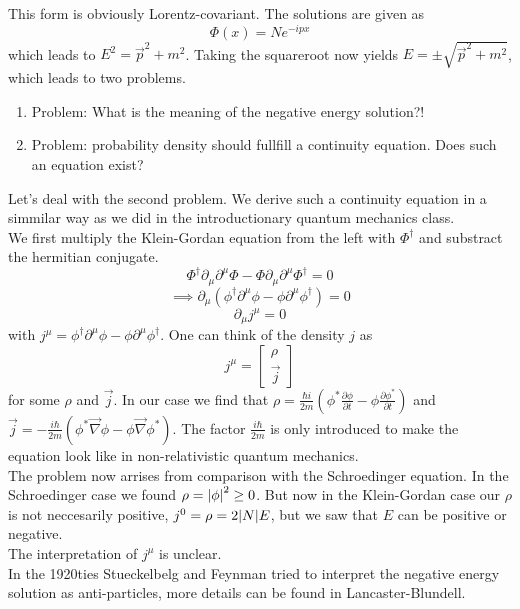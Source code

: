 \documentclass{report}
\begin{document}
This form is obviously Lorentz-covariant.
The solutions are given as \[
	\Phi(x) = N e^{-ipx}
\] which leads to $E^2 = \vec{p}^2 + m^2$. Taking the squareroot now yields $E = \pm \sqrt{\vec{p}^2 + m^2} $, which leads to two problems.
\begin{enumerate}
	\item Problem: What is the meaning of the negative energy solution?!\\
	\item Problem: probability density should fullfill a continuity equation. Does such an equation exist?
\end{enumerate}
Let's deal with the second problem. We derive such a continuity equation in a simmilar way as we did in the introductionary quantum mechanics class.\\
We first multiply the Klein-Gordan equation from the left with $\Phi^\dagger$ and substract the hermitian conjugate. \[
\Phi^\dagger \partial_\mu \partial^\mu \Phi - \Phi \partial_\mu \partial^\mu \Phi^\dagger = 0    
\] \[
\implies \partial_\mu \left( \phi^\dagger \partial^\mu \phi - \phi \partial^\mu \phi^\dagger \right)  =0
\] \[
\partial_\mu j^\mu = 0 
\] with $j^\mu = \phi^\dagger \partial^\mu \phi - \phi \partial^\mu \phi^\dagger $. One can think of the density $j$ as \[
j^\mu = \begin{bmatrix} \rho \\ \vec{j} \end{bmatrix} 
\] for some $\rho$ and $\vec{j}$. In our case we find that  $\rho = \frac{\hbar i}{2m} \left( \phi^* \frac{\partial \phi}{\partial t} - \phi \frac{\partial \phi^*}{\partial t}    \right) $ and $\vec{j} = - \frac{i \hbar}{2m} \left( \phi^* \vec{\nabla} \phi - \phi \vec{\nabla} \phi^* \right) $. The factor $\frac{i \hbar}{2m}$ is only introduced to make the equation look like in non-relativistic quantum mechanics.\\
The problem now arrises from comparison with the Schroedinger equation. In the Schroedinger case we found $\rho = \abs{\phi}^2 \ge 0$. But now in the Klein-Gordan case our $\rho$ is not neccesarily positive, $j^0 = \rho = 2 \abs{N} E$, but we saw that $E$ can be positive or negative.\\
The interpretation of $j^\mu$ is unclear.\\
In the 1920ties Stueckelbelg and Feynman tried to interpret the negative energy solution as anti-particles, more details can be found in Lancaster-Blundell. \\
\end{document}
